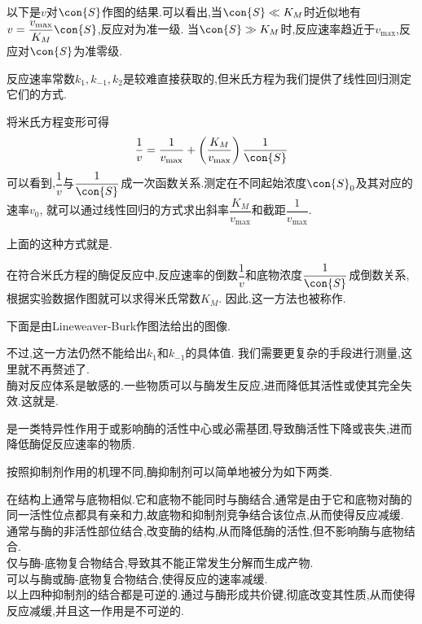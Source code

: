 \documentclass{ctexart}
\begin{document}
以下是$v$对$\con{S}$作图的结果.可以看出,当$\con{S}\ll K_M$时近似地有$v=\dfrac{v_{\max}}{K_M}\con{S}$,反应对为准一级.%
当$\con{S}\gg K_M$时,反应速率趋近于$v_{\max}$,反应对$\con{S}$为准零级.
\begin{tightcenter}
    
\end{tightcenter}
\indent 反应速率常数$k_1,k_{-1},k_2$是较难直接获取的,但米氏方程为我们提供了线性回归测定它们的方式.
\begin{derivation}
    将米氏方程变形可得
    \[\dfrac{1}{v}=\dfrac{1}{v_{\max}}+\left(\dfrac{K_M}{v_{\max}}\right)\dfrac{1}{\con{S}}\]
    可以看到,$\dfrac{1}{v}$与$\dfrac{1}{\con{S}}$成一次函数关系.测定在不同起始浓度$\con{S}_0$及其对应的速率$v_0$,%
    就可以通过线性回归的方式求出斜率$\dfrac{K_M}{v_{\max}}$和截距$\dfrac{1}{v_{\max}}$.
\end{derivation}
上面的这种方式就是.
\begin{theorem}
    在符合米氏方程的酶促反应中,反应速率的倒数$\dfrac1v$和底物浓度$\dfrac{1}{\con{S}}$成倒数关系,根据实验数据作图就可以求得米氏常数$K_M$.%
    因此,这一方法也被称作.
\end{theorem}
下面是由Lineweaver-Burk作图法给出的图像.
\begin{tightcenter}
    
\end{tightcenter}
不过,这一方法仍然不能给出$k_1$和$k_{-1}$的具体值.%
我们需要更复杂的手段进行测量,这里就不再赘述了.\vspace{4pt}\\
\indent 酶对反应体系是敏感的.一些物质可以与酶发生反应,进而降低其活性或使其完全失效.这就是.
\begin{definition}[7D.3.3 抑制剂]
    是一类特异性作用于或影响酶的活性中心或必需基团,导致酶活性下降或丧失,进而降低酶促反应速率的物质.
\end{definition}
按照抑制剂作用的机理不同,酶抑制剂可以简单地被分为如下两类.
\begin{definition}[7D.3.4 抑制剂的分类]
    在结构上通常与底物相似.它和底物不能同时与酶结合,通常是由于它和底物对酶的同一活性位点都具有亲和力,故底物和抑制剂竞争结合该位点,从而使得反应减缓.\\
    通常与酶的非活性部位结合,改变酶的结构,从而降低酶的活性,但不影响酶与底物结合.\\
    仅与酶-底物复合物结合,导致其不能正常发生分解而生成产物.\\
    可以与酶或酶-底物复合物结合,使得反应的速率减缓.\\
    以上四种抑制剂的结合都是可逆的.通过与酶形成共价键,彻底改变其性质,从而使得反应减缓,并且这一作用是不可逆的.
\end{definition}
\end{document}
